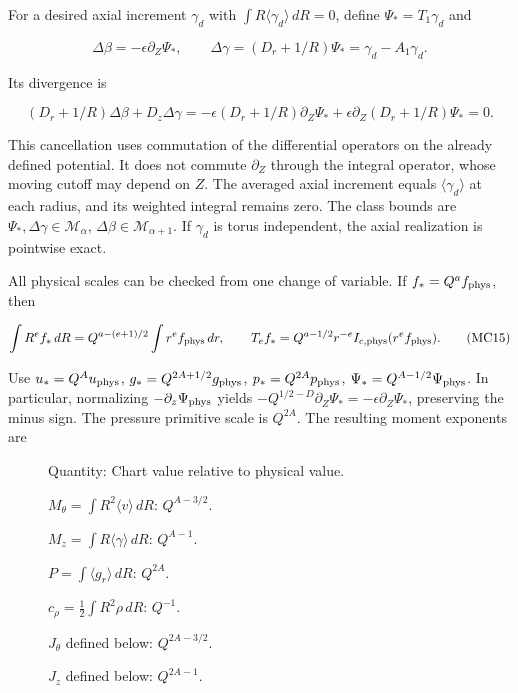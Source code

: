 \documentclass[10pt,a4paper]{article}
\begin{document}
For a desired axial increment \(\gamma_d\) with \(\int R\langle\gamma_d\rangle\,dR=0\), define \(\Psi_*=T_1\gamma_d\) and

\[
\Delta\beta=-\epsilon\partial_Z\Psi_*,\qquad
\Delta\gamma=(D_r+1/R)\Psi_*=\gamma_d-A_1\gamma_d.
\tag{MC14}
\]

Its divergence is

\[
(D_r+1/R)\Delta\beta+D_z\Delta\gamma
=-\epsilon(D_r+1/R)\partial_Z\Psi_*+
\epsilon\partial_Z(D_r+1/R)\Psi_*=0.
\]

This cancellation uses commutation of the differential operators on the already defined potential. It does not commute \(\partial_Z\) through the integral operator, whose moving cutoff may depend on \(Z\). The averaged axial increment equals \(\langle\gamma_d\rangle\) at each radius, and its weighted integral remains zero. The class bounds are \(\Psi_*,\Delta\gamma\in\mathcal M_\alpha\), \(\Delta\beta\in\mathcal M_{\alpha+1}\). If \(\gamma_d\) is torus independent, the axial realization is pointwise exact.

All physical scales can be checked from one change of variable. If \(f_*=Q^af_{\rm phys}\), then

\[
\int R^ef_*\,dR=Q^{a-(e+1)/2}\int r^ef_{\rm phys}\,dr,
\qquad
T_ef_*=Q^{a-1/2}r^{-e}I_{c,\rm phys}(r^ef_{\rm phys}).
\tag{MC15}
\]

Use \(u_*=Q^Au_{\rm phys}\), \(g_*=Q^{2A+1/2}g_{\rm phys}\), \(p_*=Q^{2A}p_{\rm phys}\), \(\Psi_*=Q^{A-1/2}\Psi_{\rm phys}\). In particular, normalizing \(-\partial_z\Psi_{\rm phys}\) yields \(-Q^{1/2-D}\partial_Z\Psi_*=-\epsilon\partial_Z\Psi_*\), preserving the minus sign. The pressure primitive scale is \(Q^{2A}\). The resulting moment exponents are

\begin{description}
\item[] Quantity: Chart value relative to physical value.
\item[] \(M_\theta=\int R^2\langle v\rangle\,dR\): \(Q^{A-3/2}\).
\item[] \(M_z=\int R\langle\gamma\rangle\,dR\): \(Q^{A-1}\).
\item[] \(P=\int\langle g_r\rangle\,dR\): \(Q^{2A}\).
\item[] \(c_\rho=\frac12\int R^2\rho\,dR\): \(Q^{-1}\).
\item[] \(J_\theta\) defined below: \(Q^{2A-3/2}\).
\item[] \(J_z\) defined below: \(Q^{2A-1}\).
\end{description}
\end{document}
